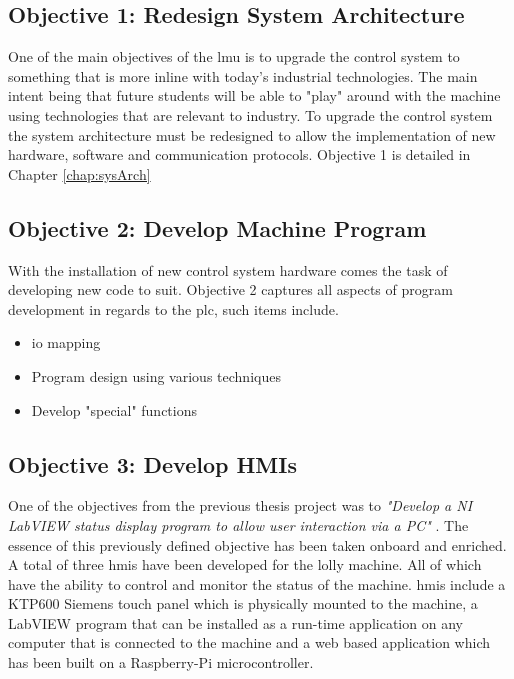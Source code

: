     
    \subsection{Objective 1: Redesign System Architecture}
        One of the main objectives of the \acrshort{lmu} is to upgrade the control system to something that is more inline with today's industrial technologies. The main intent being that future students will be able to  "play" around with the machine using technologies that are relevant to industry. To upgrade the control system the system architecture must be redesigned to allow the implementation of new hardware, software and communication protocols. Objective 1 is detailed in Chapter \ref{chap:sysArch}
        
    \subsection{Objective 2: Develop Machine Program}
        With the installation of new control system hardware comes the task of developing new code to suit.
        Objective 2 captures all aspects of program development in regards to the \acrshort{plc}, such items include.
        \begin{itemize}
            \item \acrshort{io} mapping
            \item Program design using various techniques
            \item Develop "special" functions
        \end{itemize}

        
        
    \subsection{Objective 3: Develop HMIs}
        
        One of the objectives from the previous thesis project was to \textit{"Develop a NI LabVIEW status display program to allow user interaction via a PC"} \cite{thesisJodie}. The essence of this previously defined objective has been taken onboard and enriched. A total of three \acrshort{hmi}s have been developed for the lolly machine. All of which have the ability to control and monitor the status of the machine. \acrshort{hmi}s include a KTP600 Siemens touch panel which is physically mounted to the machine, a LabVIEW program that can be installed as a run-time application on any computer that is connected to the machine and a web based application which has been built on a Raspberry-Pi microcontroller.
        
